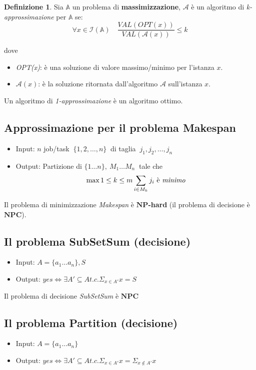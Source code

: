 \documentclass[a4paper]{article}
\theoremstyle{definition}
\newtheorem{definit}{Definizione}[subsection]
\newcommand{\np}{\mathbf{NP}}
\newcommand{\npc}{\mathbf{NPC}}
\newcommand{\prob}[1]{\mathbb{#1}}
\newcommand{\instance}[1]{\mathcal{I}(\prob{#1})}
\newcommand{\alg}[1]{\mathcal{#1}}
\begin{document}
	\begin{definit}
		Sia $\mathbb{A}$ un problema di \textbf{massimizzazione}, $\mathcal{A}$ è un algoritmo di \textit{k-approssimazione} per $\mathbb{A}$ se: 
		\[
			\forall x \in \instance{A}\quad \dfrac{VAL(OPT(x))}{VAL(\alg{A}(x))}\leq k
		\]

	\end{definit}

\noindent
dove
\begin{itemize}
	\item \textit{OPT(x)}: è una soluzione di valore massimo/minimo per l'istanza $x$.
	\item $\alg{A}(x)$: è la soluzione ritornata dall'algoritmo $\alg{A}$ sull'istanza $x$.
\end{itemize}
\noindent
Un algoritmo di \textit{1-approssimazione} è un algoritmo ottimo.
		
		\subsection{Approssimazione per il problema Makespan}
			\begin{itemize}
				\item Input: $ n $ job/task $ \ \{1, 2,\dots, n \} \ $ di taglia $ \ j_1, j_2,\dots, j_n $
				\item Output: Partizione di $ \{1 \dots n \},\ M_1 \dots M_n \ $ tale che
				\[
					\max\limits{1\leq k\leq m} \sum\limits_{i\in M_k} j_i \text{ è \textit{minimo}}
				\]
			\end{itemize}
		
		\noindent
		Il problema di minimizzazione \textit{Makespan} è $\np$\textbf{-hard} (il problema di decisione è $\npc$).
		
		\subsection{Il problema SubSetSum (decisione)}
		\begin{itemize}
			\item Input: $A = \{ a_1 \dots a_n \}, S$
			\item Output: $yes \Leftrightarrow \exists A' \subseteq A t.c. \Sigma_{x\in A'} x = S$
		\end{itemize}
		
		\noindent
		Il problema di decisione \textit{SubSetSum} è $\npc$
		
		\subsection{Il problema Partition (decisione)}
		\begin{itemize}
			\item Input: $A = \{ a_1 \dots a_n \}$
			\item Output: $yes \Leftrightarrow \exists A' \subseteq A t.c. \Sigma_{x\in A'} x = \Sigma_{x\notin A'} x$
		\end{itemize}
	
\end{document}
